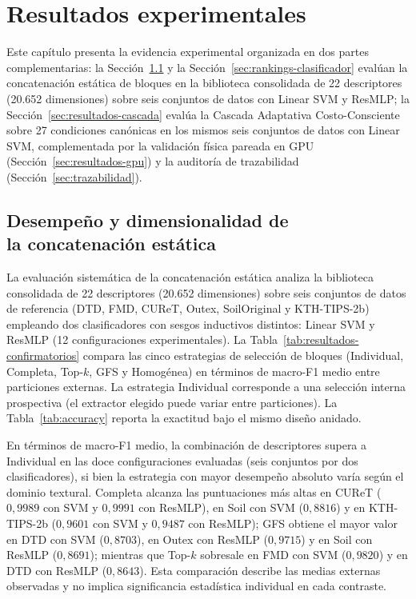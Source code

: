 \chapter{Resultados experimentales}\label{sec:resultados-experimentales}

Este capítulo presenta la evidencia experimental organizada en dos partes complementarias: la Sección~\ref{sec:resultados-fase1} y la Sección~\ref{sec:rankings-clasificador} evalúan la concatenación estática de bloques en la biblioteca consolidada de 22 descriptores (20.652 dimensiones) sobre seis conjuntos de datos con Linear SVM y ResMLP; la Sección~\ref{sec:resultados-cascada} evalúa la Cascada Adaptativa Costo-Consciente sobre 27 condiciones canónicas en los mismos seis conjuntos de datos con Linear SVM, complementada por la validación física pareada en GPU (Sección~\ref{sec:resultados-gpu}) y la auditoría de trazabilidad (Sección~\ref{sec:trazabilidad}).

\section[Desempeño y dimensionalidad]{Desempeño y dimensionalidad de\\ la concatenación estática}\label{sec:resultados-fase1}

La evaluación sistemática de la concatenación estática analiza la biblioteca consolidada de 22 descriptores (20.652 dimensiones) sobre seis conjuntos de datos de referencia (DTD, FMD, CUReT, Outex, SoilOriginal y KTH-TIPS-2b) empleando dos clasificadores con sesgos inductivos distintos: Linear SVM y ResMLP (12 configuraciones experimentales). La Tabla~\ref{tab:resultados-confirmatorios} compara las cinco estrategias de selección de bloques (Individual, Completa, Top-$k$, GFS y Homogénea) en términos de macro-F1 medio entre particiones externas. La estrategia Individual corresponde a una selección interna prospectiva (el extractor elegido puede variar entre particiones). La Tabla~\ref{tab:accuracy} reporta la exactitud bajo el mismo diseño anidado.





En términos de macro-F1 medio, la combinación de descriptores supera a Individual en las doce configuraciones evaluadas (seis conjuntos por dos clasificadores), si bien la estrategia con mayor desempeño absoluto varía según el dominio textural. Completa alcanza las puntuaciones más altas en CUReT ($0{,}9989$ con SVM y $0{,}9991$ con ResMLP), en Soil con SVM ($0{,}8816$) y en KTH-TIPS-2b ($0{,}9601$ con SVM y $0{,}9487$ con ResMLP); GFS obtiene el mayor valor en DTD con SVM ($0{,}8703$), en Outex con ResMLP ($0{,}9715$) y en Soil con ResMLP ($0{,}8691$); mientras que Top-$k$ sobresale en FMD con SVM ($0{,}9820$) y en DTD con ResMLP ($0{,}8643$). Esta comparación describe las medias externas observadas y no implica significancia estadística individual en cada contraste.

